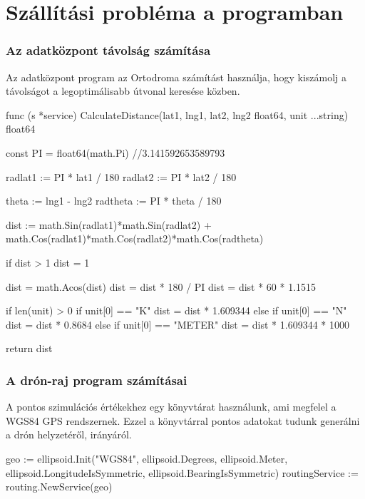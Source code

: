 \section{Szállítási probléma a programban}
\subsubsection{Az adatközpont távolság számítása}
Az adatközpont program az Ortodroma számítást használja, hogy kiszámolj a távolságot a legoptimálisabb útvonal keresése közben.
\begin{python}
    func (s *service) CalculateDistance(lat1, lng1, lat2,
    lng2 float64, unit ...string) float64 {
        const PI = float64(math.Pi) //3.141592653589793

        radlat1 := PI * lat1 / 180
        radlat2 := PI * lat2 / 180

        theta := lng1 - lng2
        radtheta := PI * theta / 180

        dist := math.Sin(radlat1)*math.Sin(radlat2) +
        math.Cos(radlat1)*math.Cos(radlat2)*math.Cos(radtheta)

        if dist > 1 {
            dist = 1
        }

        dist = math.Acos(dist)
        dist = dist * 180 / PI
        dist = dist * 60 * 1.1515

        if len(unit) > 0 {
            if unit[0] == "K" {
                dist = dist * 1.609344
            } else if unit[0] == "N" {
                dist = dist * 0.8684
            } else if unit[0] == "METER" {
                dist = dist * 1.609344 * 1000
            }
        }

        return dist
    }
\end{python}
\subsubsection{A drón-raj program számításai}
A pontos szimulációs értékekhez egy könyvtárat használunk, ami megfelel a WGS84 GPS rendszernek.
Ezzel a könyvtárral pontos adatokat tudunk generálni a drón helyzetéről, irányáról.

\begin{python}

    geo := ellipsoid.Init("WGS84", ellipsoid.Degrees, ellipsoid.Meter,
    ellipsoid.LongitudeIsSymmetric, ellipsoid.BearingIsSymmetric)
    routingService := routing.NewService(geo)

\end{python}


